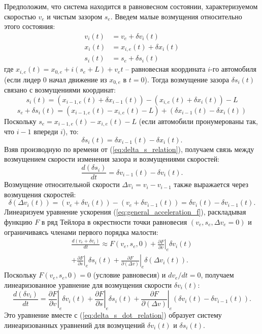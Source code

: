\documentclass[12pt, a4paper]{article}
\begin{document}
Предположим, что система находится в равновесном состоянии, характеризуемом скоростью $v_e$ и чистым зазором $s_e$. Введем малые возмущения относительно этого состояния:
\begin{align}
v_i(t) &= v_e + \delta v_i(t) \label{eq:pert_v} \\
x_i(t) &= x_{i,e}(t) + \delta x_i(t) \label{eq:pert_x} \\
s_i(t) &= s_e + \delta s_i(t) \label{eq:pert_s}
\end{align}
где $x_{i,e}(t) = x_{0,e} + i(s_e+L) + v_e t$ – равновесная координата $i$-го автомобиля (если лидер $0$ начал движение из $x_{0,e}$ в $t=0$).
Тогда возмущение зазора $\delta s_i(t)$ связано с возмущениями координат:
\[ s_i(t) = (x_{i-1,e}(t) + \delta x_{i-1}(t)) - (x_{i,e}(t) + \delta x_i(t)) - L \]
\[ s_e + \delta s_i(t) = (x_{i-1,e}(t) - x_{i,e}(t) - L) + (\delta x_{i-1}(t) - \delta x_i(t)) \]
Поскольку $s_e = x_{i-1,e}(t) - x_{i,e}(t) - L$ (если автомобили пронумерованы так, что $i-1$ впереди $i$), то:
\begin{equation}
\label{eq:delta_s_relation}
\delta s_i(t) = \delta x_{i-1}(t) - \delta x_i(t).
\end{equation}
Взяв производную по времени от (\ref{eq:delta_s_relation}), получаем связь между возмущением скорости изменения зазора и возмущениями скоростей:
\begin{equation}
\label{eq:delta_s_dot_relation}
\frac{d(\delta s_i)}{dt} = \delta v_{i-1}(t) - \delta v_i(t).
\end{equation}
Возмущение относительной скорости $\Delta v_i = v_i - v_{i-1}$ также выражается через возмущения скоростей:
\begin{equation}
\label{eq:delta_delta_v_relation}
\delta (\Delta v_i(t)) = (v_e + \delta v_i(t)) - (v_e + \delta v_{i-1}(t)) = \delta v_i(t) - \delta v_{i-1}(t).
\end{equation}
Линеаризуем уравнение ускорения (\ref{eq:general_acceleration_f}), раскладывая функцию $F$ в ряд Тейлора в окрестности точки равновесия $(v_e, s_e, \Delta v_e=0)$ и ограничиваясь членами первого порядка малости:
\begin{multline}
\label{eq:linearized_acceleration_general}
\frac{d(v_e + \delta v_i)}{dt} \approx F(v_e, s_e, 0) + \left.\frac{\partial F}{\partial v}\right|_e \delta v_i(t) \\
+ \left.\frac{\partial F}{\partial s}\right|_e \delta s_i(t) + \left.\frac{\partial F}{\partial (\Delta v)}\right|_e \delta (\Delta v_i(t)).
\end{multline}
Поскольку $F(v_e, s_e, 0) = 0$ (условие равновесия) и $dv_e/dt = 0$, получаем линеаризованное уравнение для возмущения скорости $\delta v_i(t)$:
\begin{equation}
\label{eq:linearized_dv_dt}
\frac{d(\delta v_i)}{dt} = \left.\frac{\partial F}{\partial v}\right|_e \delta v_i(t) + \left.\frac{\partial F}{\partial s}\right|_e \delta s_i(t) + \left.\frac{\partial F}{\partial (\Delta v)}\right|_e (\delta v_i(t) - \delta v_{i-1}(t)).
\end{equation}
Это уравнение вместе с (\ref{eq:delta_s_dot_relation}) образует систему линеаризованных уравнений для возмущений $\delta v_i(t)$ и $\delta s_i(t)$.
\end{document}
